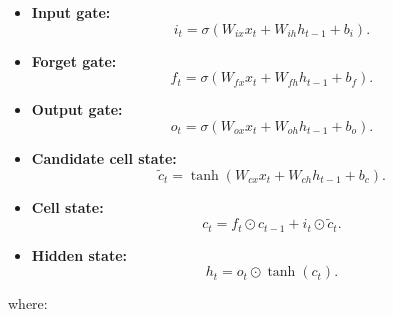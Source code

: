 \documentclass[12pt,a4paper]{report}
\numberwithin{equation}{section}
\begin{document}
\begin{itemize}
\item \textbf{Input gate:}
  \begin{equation}
  i_t = \sigma\!\left(W_{ix} x_t + W_{ih} h_{t-1} + b_i\right).
  \label{eq:lstm-input-gate}
  \end{equation}
\end{itemize}


\begin{itemize}
\item \textbf{Forget gate:}
  \begin{equation}
  f_t = \sigma\!\left(W_{fx} x_t + W_{fh} h_{t-1} + b_f\right).
  \label{eq:lstm-forget-gate}
  \end{equation}
\end{itemize}

\begin{itemize}

\item \textbf{Output gate:}
  \begin{equation}
  o_t = \sigma\!\left(W_{ox} x_t + W_{oh} h_{t-1} + b_o\right).
  \label{eq:lstm-output-gate}
  \end{equation}

\item \textbf{Candidate cell state:}
  \begin{equation}
  \widetilde{c}_t = \tanh\!\left(W_{cx} x_t + W_{ch} h_{t-1} + b_c\right).
  \label{eq:lstm-candidate-cell}
  \end{equation}

\item \textbf{Cell state:}
  \begin{equation}
  c_t = f_t \odot c_{t-1} + i_t \odot \widetilde{c}_t.
  \label{eq:lstm-cell-state}
  \end{equation}

\item \textbf{Hidden state:}
  \begin{equation}
  h_t = o_t \odot \tanh(c_t).
  \label{eq:lstm-hidden-state}
  \end{equation}

\end{itemize}

where:
\end{document}
